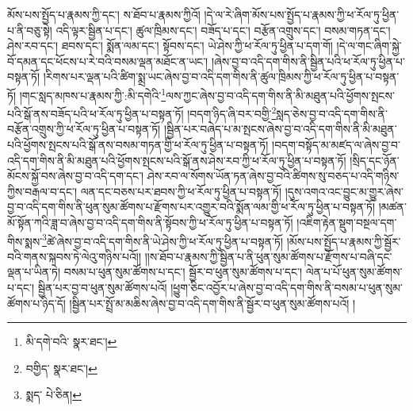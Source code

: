 མོས་པས་སྤྱོད་པ་རྣམས་ཀྱི་དང་། ས་ཐོབ་པ་རྣམས་ཀྱིའོ། །དེ་ལ་རེ་ཞིག་མོས་པས་སྤྱོད་པ་རྣམས་ཀྱི་ཕ་རོལ་ཏུ་ཕྱིན་པ་ནི་བཅུ་སྟེ། འདི་ལྟར་སྦྱིན་པ་དང་། ཚུལ་ཁྲིམས་དང་། བཟོད་པ་དང་། བརྩོན་འགྲུས་དང་། བསམ་གཏན་དང་། ཤེས་རབ་དང་། ཐབས་དང་། སྨོན་ལམ་དང་། སྟོབས་དང་། ཡེ་ཤེས་ཀྱི་ཕ་རོལ་ཏུ་ཕྱིན་པ་དག་གོ། །དེ་ལ་གང་ཞིག་སྐྱེ་བོ་དམན་དང་ཕོངས་པ་རེ་བའི་བསམ་ལྡན་མཐོང་ན་ཡང་། །ཞེས་བྱ་བ་འདི་དག་གིས་ནི་སྦྱིན་པའི་ཕ་རོལ་ཏུ་ཕྱིན་པ་བསྟན་ཏོ། །རིགས་པར་ལྡན་པའི་ཚིག་སྨྲ་ཡང་ཞེས་བྱ་བ་འདི་དག་གིས་ནི་ཚུལ་ཁྲིམས་ཀྱི་ཕ་རོལ་ཏུ་ཕྱིན་པ་བསྟན་ཏོ། །གང་སླད་མཁས་པ་རྣམས་ཀྱི་:མི་དགེའི་\footnote{མི་དགེ་བའི་  སྣར་ཐང་། }ལས་ཀྱང་ཞེས་བྱ་བ་འདི་དག་གིས་ནི་མི་མཐུན་པའི་ཕྱོགས་སྤངས་པའི་སྒོ་ནས་བཟོད་པའི་ཕ་རོལ་ཏུ་ཕྱིན་པ་བསྟན་ཏོ། །བདག་ཉིད་ཞི་བར་བགྱི་\footnote{བགྱིད་  སྣར་ཐང་། }སླད་ཅེས་བྱ་བ་འདི་དག་གིས་ནི་བརྩོན་འགྲུས་ཀྱི་ཕ་རོལ་ཏུ་ཕྱིན་པ་བསྟན་ཏོ། །སྦྱིན་པར་བཞེད་པ་མ་སྤངས་ཞེས་བྱ་བ་འདི་དག་གིས་ནི་མི་མཐུན་པའི་ཕྱོགས་སྤངས་པའི་སྒོ་ནས་བསམ་གཏན་གྱི་ཕ་རོལ་ཏུ་ཕྱིན་པ་བསྟན་ཏོ། །བདག་བསྟོད་མ་མཛད་ལ་ཞེས་བྱ་བ་འདི་དག་གིས་ནི་མི་མཐུན་པའི་ཕྱོགས་སྤངས་པའི་སྒོ་ནས་ཤེས་རབ་ཀྱི་ཕ་རོལ་ཏུ་ཕྱིན་པ་བསྟན་ཏོ། །སྲིད་དང་ཉོན་མོངས་སྐྱོ་བས་ཞེས་བྱ་བ་འདི་དག་དང་། ཤེས་རབ་ལ་སོགས་ཡོན་ཏན་ཞེས་བྱ་བའི་ཚིགས་སུ་བཅད་པ་འདི་གཉིས་ཀྱིས་བརྒལ་བ་དང་། ལན་དང་བཅས་པར་ཐབས་ཀྱི་ཕ་རོལ་ཏུ་ཕྱིན་པ་བསྟན་ཏོ། །དུས་འགའ་འང་བྱུང་མ་གྱུར་ཞེས་བྱ་བ་འདི་དག་གིས་ནི་ཕུན་སུམ་ཚོགས་པ་རྫོགས་པར་འགྱུར་བའི་སྨོན་ལམ་གྱི་ཕ་རོལ་ཏུ་ཕྱིན་པ་བསྟན་ཏོ། །མཚན་མོ་སྟོན་ཀའི་ཟླ་བ་ཞེས་བྱ་བ་འདི་དག་གིས་ནི་སྟོབས་ཀྱི་ཕ་རོལ་ཏུ་ཕྱིན་པ་བསྟན་ཏོ། །འཇིག་རྟེན་སྡུག་བསྔལ་དག་གིས་སྨས་\footnote{སྨད་  པེ་ཅིན། }ཚེ་ཞེས་བྱ་བ་འདི་དག་གིས་ནི་ཡེ་ཤེས་ཀྱི་ཕ་རོལ་ཏུ་ཕྱིན་པ་བསྟན་ཏོ། །མོས་པས་སྤྱོད་པ་རྣམས་ཀྱི་སྦྱོར་བའི་གནས་སྐབས་ཏེ་ལེའུ་གཉིས་པའོ།། །།ས་ཐོབ་པ་རྣམས་ཀྱི་སྦྱིན་པ་ནི་ཕུན་སུམ་ཚོགས་པ་རྫོགས་པ་བཞི་དང་ལྡན་པ་ཡིན་ཏེ། བསམ་པ་ཕུན་སུམ་ཚོགས་པ་དང་། སྦྱོར་བ་ཕུན་སུམ་ཚོགས་པ་དང་། ལེན་པ་པོ་ཕུན་སུམ་ཚོགས་པ་དང་། སྦྱིན་པར་བྱ་བ་ཕུན་སུམ་ཚོགས་པའོ། །ཕྱུག་ཅིང་འབྱོར་པ་ཞེས་བྱ་བ་འདི་དག་གིས་ནི་བསམ་པ་ཕུན་སུམ་ཚོགས་པ་ཉིད་དོ། །སྦྱིན་པར་སྤྲོ་མ་མཆིས་ཞེས་བྱ་བ་འདི་དག་གིས་ནི་སྦྱོར་བ་ཕུན་སུམ་ཚོགས་པའོ། །
